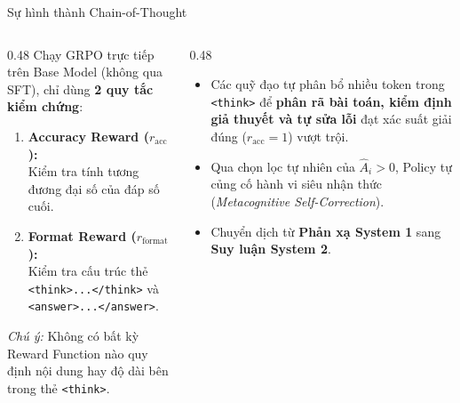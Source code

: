 \begin{frame}{Sự hình thành Chain-of-Thought}
  \begin{columns}[T,onlytextwidth]
    \begin{column}{0.48\textwidth}
      \small
      Chạy GRPO trực tiếp trên Base Model (không qua SFT), chỉ dùng \textbf{2 quy tắc kiểm chứng}:
      \begin{enumerate}\setlength{\itemsep}{4pt}
        \item \textbf{Accuracy Reward ($r_{\text{acc}}$):}\\
          Kiểm tra tính tương đương đại số của đáp số cuối.
        \item \textbf{Format Reward ($r_{\text{format}}$):}\\
          Kiểm tra cấu trúc thẻ \texttt{<think>...</think>} và \texttt{<answer>...</answer>}.
      \end{enumerate}
      \vspace{0.04cm}
      \footnotesize
      \textit{Chú ý:} Không có bất kỳ Reward Function nào quy định nội dung hay độ dài bên trong thẻ \texttt{<think>}.
    \end{column}
    \begin{column}{0.48\textwidth}
      \small
      \begin{itemize}\setlength{\itemsep}{4pt}
        \item Các quỹ đạo tự phân bổ nhiều token trong \texttt{<think>} để \textbf{phân rã bài toán, kiểm định giả thuyết và tự sửa lỗi} đạt xác suất giải đúng ($r_{\text{acc}} = 1$) vượt trội.
        \item Qua chọn lọc tự nhiên của $\hat{A}_i > 0$, Policy tự củng cố hành vi siêu nhận thức (\textit{Metacognitive Self-Correction}).
        \item Chuyển dịch từ \textbf{Phản xạ System 1} sang \textbf{Suy luận System 2}.
      \end{itemize}
    \end{column}
  \end{columns}
  \par\vspace{0pt}
\end{frame}

